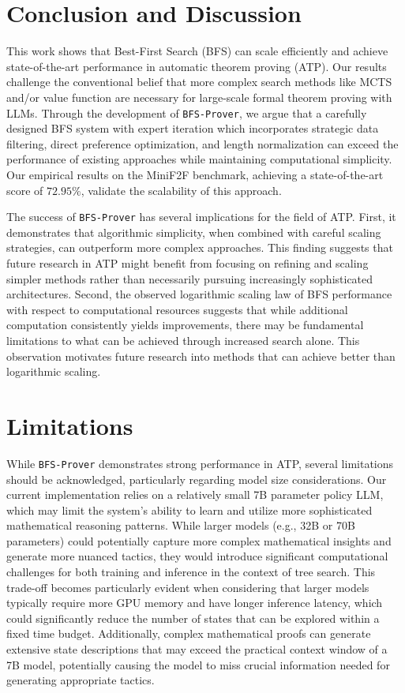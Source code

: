 \documentclass[10pt,english]{article}
\begin{document}
\section{Conclusion and Discussion}\label{sec:conclude}
This work shows that Best-First Search (BFS) can scale efficiently and achieve state-of-the-art performance in automatic theorem proving (ATP). Our results challenge the conventional belief that more complex search methods like MCTS and/or value function are necessary for large-scale formal theorem proving with LLMs. Through the development of \texttt{BFS-Prover}, we argue that a carefully designed BFS system with expert iteration which incorporates strategic data filtering, direct preference optimization, and length normalization can exceed the performance of existing approaches while maintaining computational simplicity. Our empirical results on the MiniF2F benchmark, achieving a state-of-the-art score of $72.95\%$, validate the scalability of this approach.

The success of \texttt{BFS-Prover} has several implications for the field of ATP. First, it demonstrates that algorithmic simplicity, when combined with careful scaling strategies, can outperform more complex approaches. This finding suggests that future research in ATP might benefit from focusing on refining and scaling simpler methods rather than necessarily pursuing increasingly sophisticated architectures. Second, the observed logarithmic scaling law of BFS performance with respect to computational resources suggests that while additional computation consistently yields improvements, there may be fundamental limitations to what can be achieved through increased search alone. This observation motivates future research into methods that can achieve better than logarithmic scaling.

\section*{Limitations}
While \texttt{BFS-Prover} demonstrates strong performance in ATP, several limitations should be acknowledged, particularly regarding model size considerations. Our current implementation relies on a relatively small 7B parameter policy LLM, which may limit the system's ability to learn and utilize more sophisticated mathematical reasoning patterns. While larger models (e.g., 32B or 70B parameters) could potentially capture more complex mathematical insights and generate more nuanced tactics, they would introduce significant computational challenges for both training and inference in the context of tree search. This trade-off becomes particularly evident when considering that larger models typically require more GPU memory and have longer inference latency, which could significantly reduce the number of states that can be explored within a fixed time budget. Additionally, complex mathematical proofs can generate extensive state descriptions that may exceed the practical context window of a 7B model, potentially causing the model to miss crucial information needed for generating appropriate tactics.
\end{document}
